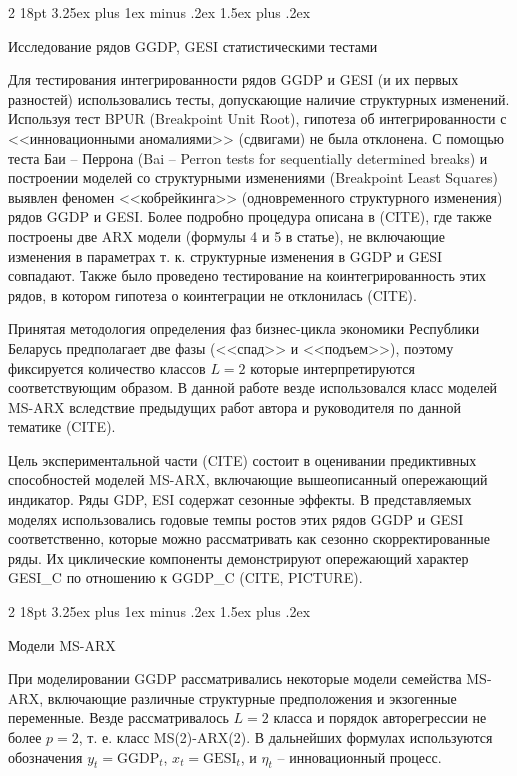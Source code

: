 \documentclass[a4paper,14pt]{extreport}
\makeatletter
\renewcommand{\subsection} {
  \@startsection{subsection}
                {2}
                {18pt}
                {3.25ex plus 1ex minus .2ex}
                {1.5ex plus .2ex}
                {\normalfont\large\bfseries\raggedright}
}
\makeatother
\begin{document}
\subsection{Исследование рядов GGDP, GESI статистическими тестами}

Для тестирования интегрированности рядов GGDP и GESI (и их первых разностей) использовались тесты, допускающие наличие структурных изменений. Используя тест BPUR (Breakpoint Unit Root), гипотеза об интегрированности с <<инновационными аномалиями>> (сдвигами) не была отклонена. С помощью теста Баи – Перрона (Bai – Perron tests for sequentially determined breaks) и построении моделей со структурными изменениями (Breakpoint Least Squares) выявлен феномен <<кобрейкинга>> (одновременного структурного изменения) рядов GGDP и GESI. Более подробно процедура описана в (CITE), где также построены две ARX модели (формулы 4 и 5 в статье), не включающие изменения в параметрах т. к.  структурные изменения в GGDP и GESI совпадают. Также было проведено тестирование на коинтегрированность этих рядов, в котором гипотеза о коинтеграции не отклонилась (CITE). 

Принятая методология определения фаз бизнес-цикла экономики Республики Беларусь предполагает две фазы (<<спад>> и <<подъем>>), поэтому фиксируется количество классов $L=2$ которые интерпретируются соответствующим образом. В данной работе везде использовался класс моделей MS-ARX вследствие предыдущих работ автора и руководителя по данной тематике (CITE).

Цель экспериментальной части (CITE) состоит в оценивании предиктивных способностей моделей MS-ARX, включающие вышеописанный опережающий индикатор. Ряды GDP, ESI содержат сезонные эффекты. В представляемых моделях использовались годовые темпы ростов этих рядов GGDP и GESI соответственно, которые можно рассматривать как сезонно скорректированные ряды. Их циклические компоненты демонстрируют опережающий характер GESI\_C по отношению к GGDP\_C (CITE, PICTURE).

\subsection{Модели MS-ARX}


При моделировании GGDP рассматривались некоторые модели семейства MS-ARX, включающие различные структурные предположения и экзогенные переменные. Везде рассматривалось $L=2$ класса и порядок авторегрессии не более $p=2$, т. е. класс MS(2)-ARX(2). В дальнейших формулах используются обозначения $y_t = \text{GGDP}_t$, $x_t = \text{GESI}_t$, и $\eta_t$ -- инновационный процесс.
\end{document}
